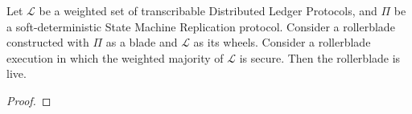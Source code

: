 \begin{theorem}[Liveness]
      Let $\mathcal{L}$ be a weighted set of transcribable Distributed Ledger Protocols,
      and $\Pi$ be a soft-deterministic State Machine Replication protocol.
      Consider a rollerblade constructed with $\Pi$ as a blade and
      $\mathcal{L}$ as its wheels.
      Consider a rollerblade execution in which the weighted majority of $\mathcal{L}$
      is secure.
      Then the rollerblade is live.
\end{theorem}
\begin{proof}
\end{proof}
